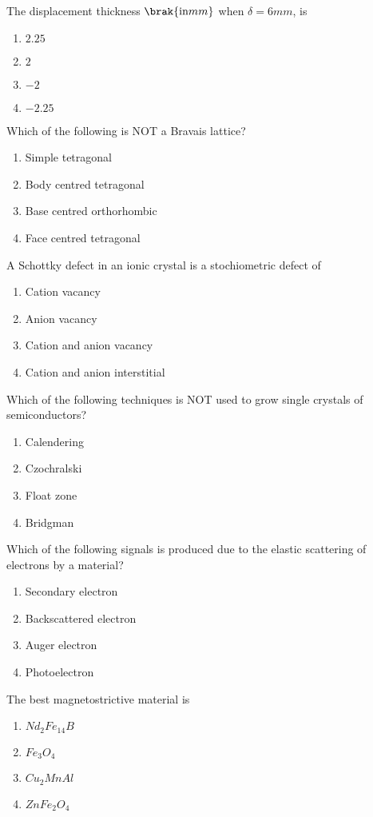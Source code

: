 \item The displacement thickness $\brak{\text{in} mm}$ when $\delta = 6 mm$, is
\begin{enumerate}
    \item $2.25$
    \item $2$
    \item $-2$
    \item $-2.25$
\end{enumerate}
\item Which of the following is NOT a Bravais lattice?
\begin{enumerate}
    \item Simple tetragonal
    \item Body centred tetragonal
    \item Base centred orthorhombic
    \item Face centred tetragonal
\end{enumerate}
\item A Schottky defect in an ionic crystal is a stochiometric defect of
\begin{enumerate}
    \item Cation vacancy
    \item Anion vacancy
    \item Cation and anion vacancy
    \item Cation and anion interstitial
\end{enumerate}
\item Which of the following techniques is NOT used to grow single crystals of semiconductors?
    \begin{enumerate}
    \item Calendering \item Czochralski \item Float zone \item Bridgman
\end{enumerate}
\item Which of the following signals is produced due to the elastic scattering of electrons by a material?
\begin{enumerate}
    \item Secondary electron
    \item Backscattered electron
    \item Auger electron
    \item Photoelectron
\end{enumerate}
\item The best magnetostrictive material is
\begin{enumerate}
    \item $Nd_2Fe_{14}B$ \item $Fe_3O_4$ \item $Cu_2MnAl$ \item $ZnFe_2O_4$
\end{enumerate}

